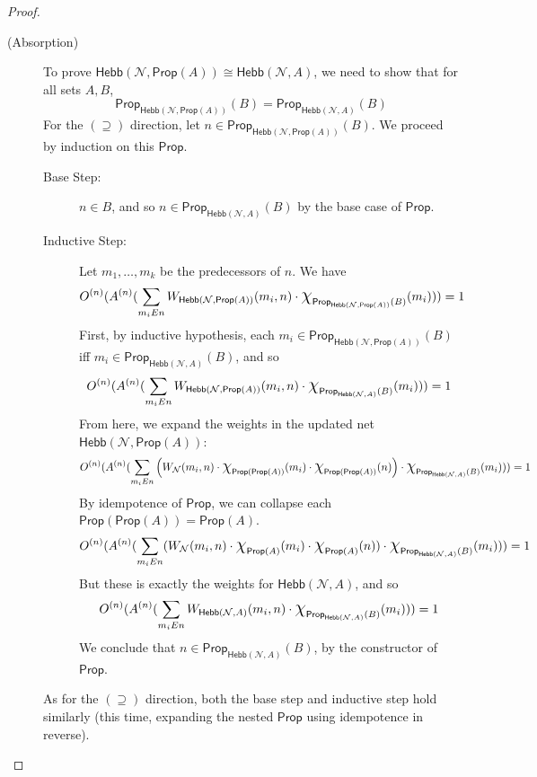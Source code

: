 \documentclass[letterpaper]{article}
\theoremstyle{definition}
\newcommand*{\bigchi}{\mbox{\Large$\chi$}}%
\newcommand{\Prop}{\textsf{Prop}}
\newcommand{\Inc}{\textsf{Hebb}}
\newcommand{\Net}{\mathcal{N}}
\begin{document}
\begin{proof}
\begin{description}
    \item[(Absorption)] 
    To prove $\Inc(\Net, \Prop(A)) \cong \Inc(\Net, A)$, we need to show that for all sets $A, B$,
    \[
        \Prop_{\Inc(\Net, \Prop(A))}(B) = \Prop_{\Inc(\Net, A)}(B)
    \]
    For the $(\supseteq)$ direction, let $n \in \Prop_{\Inc(\Net, \Prop(A))}(B)$. We proceed by induction on this $\Prop$.
    \begin{description}
        \item[Base Step:] $n \in B$, and so $n \in \Prop_{\Inc(\Net, A)}(B)$ by the base case of $\Prop$.
        \item[Inductive Step:] Let $m_1, \ldots, m_k$ be the predecessors of $n$. We have
        \[
            O^{(n)}(A^{(n)}(\sum_{m_i{E}n} W_{\Inc(\Net, \Prop(A))}(m_i, n) \cdot \bigchi_{\Prop_{\Inc(\Net, \Prop(A))}(B)}(m_i))) = 1
        \]
        First, by inductive hypothesis, each $m_i \in \Prop_{\Inc(\Net, \Prop(A))}(B)$ iff $m_i \in \Prop_{\Inc(\Net, A)}(B)$, and so 
        \[
            O^{(n)}(A^{(n)}(\sum_{m_i{E}n} W_{\Inc(\Net, \Prop(A))}(m_i, n) \cdot \bigchi_{\Prop_{\Inc(\Net, A)}(B)}(m_i))) = 1
        \]
        From here, we expand the weights in the updated net $\Inc(\Net, \Prop(A))$:
        \[
            O^{(n)}(A^{(n)}(\sum_{m_i{E}n} 
            \left( W_\Net(m_i, n) \cdot \bigchi_{\Prop(\Prop(A))}(m_i) \cdot \bigchi_{\Prop(\Prop(A))}(n) \right) 
            \cdot \bigchi_{\Prop_{\Inc(\Net, A)}(B)}(m_i))) = 1
        \]
        By idempotence of $\Prop$, we can collapse each $\Prop(\Prop(A)) = \Prop(A)$.
        \[
            O^{(n)}(A^{(n)}(\sum_{m_i{E}n} 
            (W_\Net(m_i, n) \cdot \bigchi_{\Prop(A)}(m_i) \cdot \bigchi_{\Prop(A)}(n)) 
            \cdot \bigchi_{\Prop_{\Inc(\Net, A)}(B)}(m_i))) = 1
        \]
        But these is exactly the weights for $\Inc(\Net, A)$, and so
        \[
            O^{(n)}(A^{(n)}(\sum_{m_i{E}n} W_{\Inc(\Net, A)}(m_i, n) \cdot \bigchi_{\Prop_{\Inc(\Net, A)}(B)}(m_i))) = 1
        \]
        We conclude that $n \in \Prop_{\Inc(\Net, A)}(B)$, by the constructor of $\Prop$.
    \end{description}
    As for the $(\supseteq)$ direction, both the base step and inductive step hold similarly (this time, expanding the nested $\Prop$ using idempotence in reverse).
    

\end{description}
\end{proof}
\end{document}
